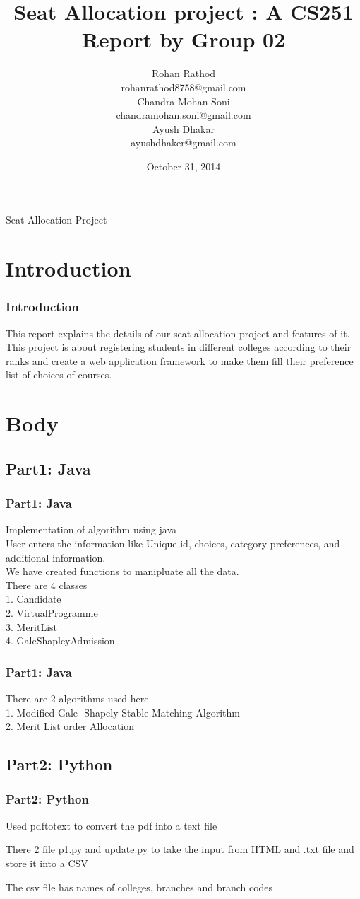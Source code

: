 \documentclass[]{beamer}%
\title{Seat Allocation project : A CS251 Report by Group 02}
\author{Rohan Rathod \space 130050002 \\
	rohanrathod8758@gmail.com\\
	Chandra Mohan Soni \space 130050020 \\
	chandramohan.soni@gmail.com\\
	Ayush Dhakar \space 130050033\\
	ayushdhaker@gmail.com
	}
\date{October 31, 2014}
\begin{document}
\begin{frame}
\titlepage
Seat Allocation Project 
\end{frame}

\section{Introduction}
\begin{frame}
\frametitle{Introduction}
This report explains the details of our seat allocation project and features of it.
This project is about registering students in different colleges according to their ranks and create a web application framework to make them fill their preference list of choices of courses.
\end{frame}
\section{Body}
\subsection{Part1: Java }
\begin{frame}
\frametitle{Part1: Java}
 Implementation of algorithm using java  \\  \pause  User enters the information like Unique id, choices, category preferences, and additional information.\\  \pause We have created functions to manipluate all the data. \\   \pause There are 4 classes \\ 1. Candidate \\ 2. VirtualProgramme \\ 3. MeritList \\ 4. GaleShapleyAdmission \\ \pause


\end{frame}
\begin{frame}
\frametitle{Part1: Java }
 There are 2 algorithms used here.  \\ 1. Modified Gale- Shapely Stable Matching Algorithm \\ 2. Merit List order Allocation\pause


\end{frame}

\subsection{Part2: Python }
\begin{frame}
\frametitle{Part2: Python }
Used pdftotext to convert the pdf into a text file \\ \pause

There 2 file p1.py and update.py to take the input from HTML and .txt file and store it into a CSV  \\ \pause

The csv file has names of colleges, branches and branch codes

\end{frame}
\end{document}
